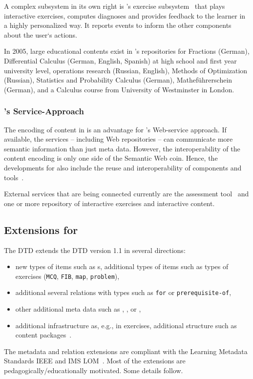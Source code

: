 A complex subsystem in its own right is {\activemath}'s exercise subsystem~\cite{icce05}
that plays interactive exercises, computes diagnoses and provides feedback to the learner
in a highly personalized way. It reports events to inform the other components about the
user`s actions.

In 2005, large educational contents exist in {\activemath}'s repositories for Fractions
(German), Differential Calculus (German, English, Spanish) at high school and first year
university level, operations research (Russian, English), Methods of Optimization
(Russian), Statistics and Probability Calculus (German), Mathef{\"u}hrerschein (German),
and a Calculus course from University of Westminster in London. 

\subsubsection{{\activemath}'s  Service-Approach}

The encoding of content in {\omdoc} is an advantage for {\activemath}'s Web-service
approach. If available, the services -- including Web repositories -- can communicate more
semantic information than just meta data.  However, the interoperability of the content
encoding is only one side of the Semantic Web coin. Hence, the developments for
{\activemath} also include the reuse and interoperability of components and
tools~\cite{Melisetal-SemanticAware-BJET-2005}.

External services that are being connected currently are the {} assessment
tool~\cite{Conejo-Siette-IJAIED-04} and one or more repository of interactive exercises
and interactive content.

\subsection{{\omdoc} Extensions for {\activemath}}

The {\activemath} DTD extends the {\omdoc} DTD version 1.1 in several directions:
\begin{itemize}
\item new types of items such as s, additional types of items such
  as types of exercises ({\tt{MCQ}}, {\tt{FIB}}, {\tt{map}}, {\tt{problem}}),
\item additional several relations with types such as {\tt{for}} or {\tt{prerequisite-of}},
\item other additional meta data such as {}, {}, or
  {},
\item additional infrastructure as, e.g., in exercises, additional structure such as
  content packages~\cite{LeAMD6}.
\end{itemize}
The metadata and relation extensions are compliant with the Learning Metadata Standards
IEEE and IMS LOM~\cite{lom3_6,ims_lom}. Most of the extensions are
pedagogically/educationally motivated. Some details follow.

